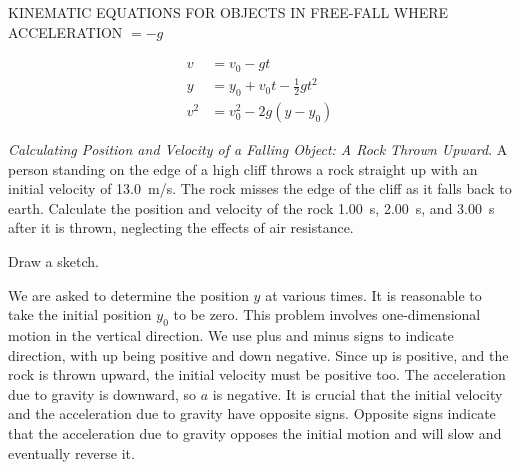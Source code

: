 \documentclass[../../main-ap-physics.tex]{subfiles}
\begin{document}
\begin{gradient}{KINEMATIC EQUATIONS FOR OBJECTS IN FREE-FALL WHERE ACCELERATION $= -g$}

    \vspace{-1em}
    
    \begin{align}
        v &= v_0 - gt \label{HyF2SE} \\[1ex]
        y &= y_0 + v_0 t - \frac{1}{2} g t^2 \label{aobjvO} \\[1ex]
        v^2 &= v_0^2 - 2 g \left(y - y_0\right) \label{rYOesE}
    \end{align}
\end{gradient}

\begin{example} \label{zPUpxb}
    \textit{Calculating Position and Velocity of a Falling Object: A Rock Thrown Upward}. A person standing on the edge of a high cliff throws a rock straight up with an initial velocity of \SI{13.0}{m/s}. The rock misses the edge of the cliff as it falls back to earth. Calculate the position and velocity of the rock \SI{1.00}{s}, \SI{2.00}{s}, and \SI{3.00}{s} after it is thrown, neglecting the effects of air resistance.
\end{example}

\Solution Draw a sketch.

\begin{center}
\end{center}

We are asked to determine the position $y$ at various times. It is reasonable to take the initial position $y_0$ to be zero. This problem involves one-dimensional motion in the vertical direction. We use plus and minus signs to indicate direction, with up being positive and down negative. Since up is positive, and the rock is thrown upward, the initial velocity must be positive too. The acceleration due to gravity is downward, so $a$ is negative. It is crucial that the initial velocity and the acceleration due to gravity have opposite signs. Opposite signs indicate that the acceleration due to gravity opposes the initial motion and will slow and eventually reverse it.
\end{document}
